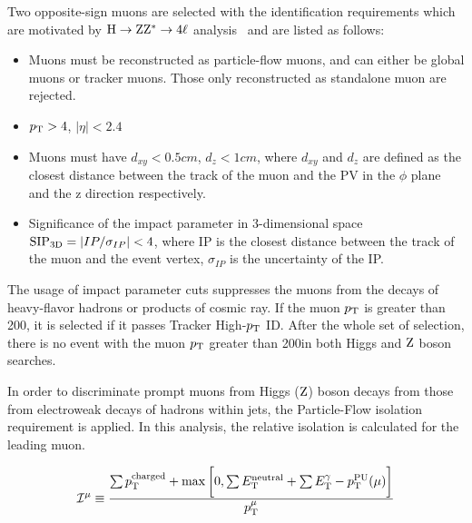 		Two opposite-sign muons are selected with the identification requirements which are motivated by $\mathrm{H}\to\mathrm{Z}\mathrm{Z}^{*}\to 4\ell$ analysis~\cite{Sirunyan:2017exp} and are listed as follows: 
		\begin{itemize}
		\item Muons must be reconstructed as particle-flow muons, and can either be global muons or tracker muons. Those only reconstructed as standalone muon are rejected.
		\item $p_{\mathrm{T}} > 4$, $|\eta| < 2.4$
		\item Muons must have $d_{xy}< 0.5\unit{cm}$, $d_{z} < 1\unit{cm}$, where $d_{xy}$ and $d_{z}$ are defined as the closest distance between the track of the muon and the PV in the $\phi$ plane and the z direction respectively. 
		\item Significance of the impact parameter in 3-dimensional space ${\rm SIP_{3D}}=|IP/\sigma_{IP}| < 4$, where IP is the closest distance between the track of the muon and the event vertex, $\sigma_{IP}$ is the uncertainty of the IP. 
		\end{itemize}
		The usage of impact parameter cuts suppresses the muons from the decays of heavy-flavor hadrons or products of cosmic ray. If the muon $p_{\mathrm{T}}$ is greater than 200\GeV, it is selected if it passes Tracker High-$p_{\mathrm{T}}$ ID. After the whole set of selection, there is no event with the muon $p_{\mathrm{T}}$ greater than 200\GeV in both Higgs and $\mathrm{Z}$ boson searches.

		In order to discriminate prompt muons from Higgs ($\mathrm{Z}$) boson decays from those from electroweak decays of hadrons within jets, the Particle-Flow isolation requirement is applied. In this analysis, the relative isolation is calculated for the leading muon.
	
		\begin{equation}
		\mathcal{I}^{\mu}\equiv \frac{\sum p_{\mathrm{T}}^{\text{charged}} + \max \bigg [0, \sum E_{\mathrm{T}}^{\text{neutral}} + \sum E_{\mathrm{T}}^{\gamma} - p_{\mathrm{T}}^{\text{PU}}(\mu)\bigg ]}{p_{\mathrm{T}}^{\mu}}
		\end{equation}	
		
